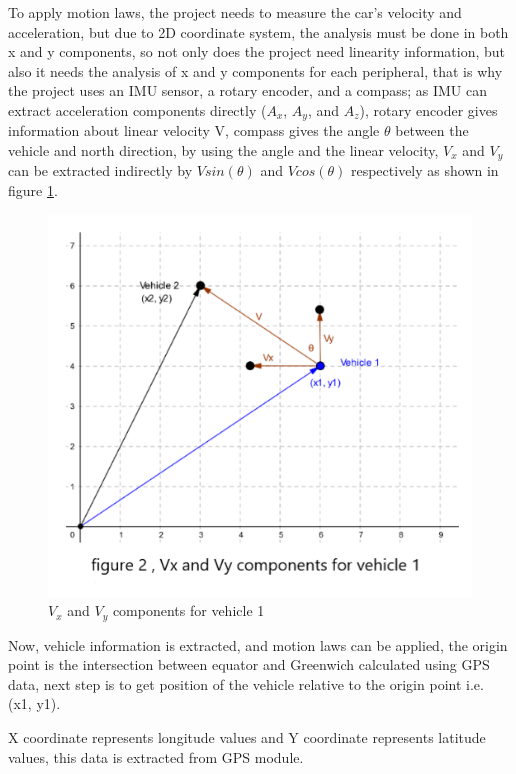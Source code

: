 To apply motion laws, the project needs to measure the car's velocity and acceleration, but due to 2D coordinate system, the analysis must be done in both x and y components, so not only does the project need linearity information, but also it needs the analysis of x and y components for each peripheral, that is why the project uses  an IMU sensor, a rotary encoder, and a compass; as IMU can extract acceleration components directly ($A_x$, $A_y$, and $A_z$), rotary encoder gives information about linear velocity V, compass gives the angle $\theta$ between the vehicle and north direction, by using the angle and the linear velocity, $V_x$ and $V_y$ can be extracted indirectly by $Vsin(\theta)$ and $V cos(\theta)$ respectively as shown in figure \ref{fig:vx-vy}.
\begin{figure}[h]
    \centering
    \includegraphics{figure/6_2.png}
    \caption{$V_x$ and $V_y$ components for vehicle 1}
    \label{fig:vx-vy}
\end{figure}
Now, vehicle information is extracted, and motion laws can be applied, the origin point is the intersection between equator and Greenwich calculated using GPS data, next step is to get position of the vehicle relative to the origin point i.e. (x1, y1).

X coordinate represents longitude values and Y coordinate represents latitude values, this data is extracted from GPS module.

